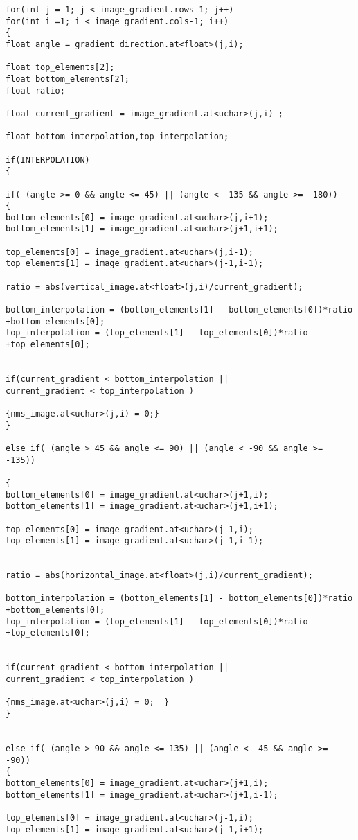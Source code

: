 \begin{lstlisting}
for(int j = 1; j < image_gradient.rows-1; j++)
for(int i =1; i < image_gradient.cols-1; i++)
{
float angle = gradient_direction.at<float>(j,i);

float top_elements[2];
float bottom_elements[2];
float ratio;

float current_gradient = image_gradient.at<uchar>(j,i) ;

float bottom_interpolation,top_interpolation;

if(INTERPOLATION)
{

if( (angle >= 0 && angle <= 45) || (angle < -135 && angle >= -180))
{
bottom_elements[0] = image_gradient.at<uchar>(j,i+1);
bottom_elements[1] = image_gradient.at<uchar>(j+1,i+1);

top_elements[0] = image_gradient.at<uchar>(j,i-1);
top_elements[1] = image_gradient.at<uchar>(j-1,i-1);

ratio = abs(vertical_image.at<float>(j,i)/current_gradient);

bottom_interpolation = (bottom_elements[1] - bottom_elements[0])*ratio +bottom_elements[0];
top_interpolation = (top_elements[1] - top_elements[0])*ratio +top_elements[0];			


if(current_gradient < bottom_interpolation ||
current_gradient < top_interpolation )

{nms_image.at<uchar>(j,i) = 0;}
}

else if( (angle > 45 && angle <= 90) || (angle < -90 && angle >= -135))

{
bottom_elements[0] = image_gradient.at<uchar>(j+1,i);
bottom_elements[1] = image_gradient.at<uchar>(j+1,i+1);

top_elements[0] = image_gradient.at<uchar>(j-1,i);
top_elements[1] = image_gradient.at<uchar>(j-1,i-1);


ratio = abs(horizontal_image.at<float>(j,i)/current_gradient);

bottom_interpolation = (bottom_elements[1] - bottom_elements[0])*ratio +bottom_elements[0];
top_interpolation = (top_elements[1] - top_elements[0])*ratio +top_elements[0];			


if(current_gradient < bottom_interpolation ||
current_gradient < top_interpolation )

{nms_image.at<uchar>(j,i) = 0;	}
}


else if( (angle > 90 && angle <= 135) || (angle < -45 && angle >= -90))
{
bottom_elements[0] = image_gradient.at<uchar>(j+1,i);
bottom_elements[1] = image_gradient.at<uchar>(j+1,i-1);

top_elements[0] = image_gradient.at<uchar>(j-1,i);
top_elements[1] = image_gradient.at<uchar>(j-1,i+1);



\end{lstlisting}
